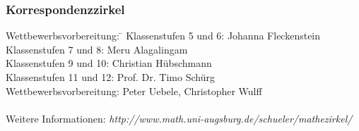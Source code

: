 \documentclass[a4paper,ngerman,14pt]{scrartcl}
\begin{document}
\subsubsection*{Korrespondenzzirkel}

\begin{tabbing}
  Wettbewerbsvorbereitung: \= \kill
  Klassenstufen 5 und 6: \> Johanna Fleckenstein \\
  Klassenstufen 7 und 8: \> Meru Alagalingam \\
  Klassenstufen 9 und 10: \> Christian Hübschmann \\
  Klassenstufen 11 und 12: \> Prof. Dr. Timo Schürg \\
  Wettbewerbsvorbereitung: \> Peter Uebele, Christopher Wulff \\
  \\
\small
Weitere Informationen: \textsl{http:/$\!$/www.math.uni-augsburg.de/schueler/mathezirkel/}
\end{tabbing}
\end{document}
